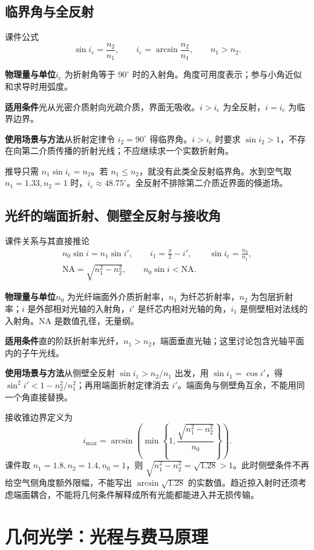 \documentclass[UTF8,fontset=none,zihao=-4,a4paper]{ctexart}
\newcommand{\chapterpage}[1]{\clearpage\section{#1}}
\newcommand{\explain}[3]{\par\noindent\textbf{物理量与单位}\quad #1\par
\noindent\textbf{适用条件}\quad #2\par
\noindent\textbf{使用场景与方法}\quad #3\par}
\begin{document}
\subsection{临界角与全反射}
\begin{infobox}{课件公式}
\[
 \sin i_{\mathrm c}=\frac{n_2}{n_1},\qquad
 i_{\mathrm c}=\arcsin\frac{n_2}{n_1},\qquad n_1>n_2.
\]
\end{infobox}
\explain{$i_{\mathrm c}$ 为折射角等于 $90^\circ$ 时的入射角。角度可用度表示；参与小角近似和求导时用弧度。}{光从光密介质射向光疏介质，界面无吸收。$i>i_{\mathrm c}$ 为全反射，$i=i_{\mathrm c}$ 为临界边界。}{从折射定律令 $i_2=90^\circ$ 得临界角。$i>i_{\mathrm c}$ 时要求 $\sin i_2>1$，不存在向第二介质传播的折射光线；不应继续求一个实数折射角。}
推导只需 $n_1\sin i_{\mathrm c}=n_2$。若 $n_1\le n_2$，就没有此类全反射临界角。水到空气取 $n_1=1.33,n_2=1$ 时，$i_{\mathrm c}\approx48.75^\circ$。全反射不排除第二介质近界面的倏逝场。

\subsection{光纤的端面折射、侧壁全反射与接收角}
\begin{infobox}{课件关系与其直接推论}
\begin{gather*}
 n_0\sin i=n_1\sin i',\qquad i_1=\frac\pi2-i',\qquad
 \sin i_{\mathrm c}=\frac{n_2}{n_1},\\
 \mathrm{NA}=\sqrt{n_1^2-n_2^2},\qquad
 n_0\sin i<\mathrm{NA}.
\end{gather*}
\end{infobox}
\explain{$n_0$ 为光纤端面外介质折射率，$n_1$ 为纤芯折射率，$n_2$ 为包层折射率；$i$ 是外部相对光轴的入射角，$i'$ 是纤芯内相对光轴的角，$i_1$ 是侧壁相对法线的入射角。NA 是数值孔径，无量纲。}{直的阶跃折射率光纤，$n_1>n_2$，端面垂直光轴；这里讨论包含光轴平面内的子午光线。}{从侧壁全反射 $\sin i_1>n_2/n_1$ 出发，用 $\sin i_1=\cos i'$，得 $\sin^2 i'<1-n_2^2/n_1^2$；再用端面折射定律消去 $i'$。端面角与侧壁角互余，不能用同一个角直接替换。}
接收锥边界定义为
\[
 i_{\max}=\arcsin\!\left(\min\left\{1,\frac{\sqrt{n_1^2-n_2^2}}{n_0}\right\}\right).
\]
课件取 $n_1=1.8,n_2=1.4,n_0=1$，则 $\sqrt{n_1^2-n_2^2}=\sqrt{1.28}>1$。此时侧壁条件不再给空气侧角度额外限幅，不能写出 $\arcsin\sqrt{1.28}$ 的实数值。趋近掠入射时还须考虑端面耦合，不能将几何条件解释成所有光能都能进入并无损传输。

\chapterpage{几何光学：光程与费马原理}
\end{document}
